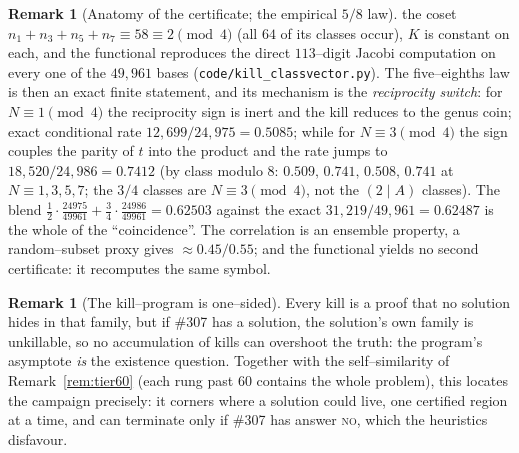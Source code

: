 \documentclass[11pt]{article}
\theoremstyle{definition}
\newtheorem{remark}[theorem]{Remark}
\begin{document}
\begin{remark}[Anatomy of the certificate; the empirical $5/8$ law]
the coset $n_1+n_3+n_5+n_7\equiv58\equiv2\pmod4$ (all $64$ of its classes occur), $K$ is constant
on each, and the functional reproduces the direct $113$--digit Jacobi computation on every one of
the $49{,}961$ bases (\texttt{code/kill\_classvector.py}). The five--eighths law is then an exact
finite statement, and its mechanism is the \emph{reciprocity switch}: for $N\equiv1\pmod4$ the
reciprocity sign is inert and the kill reduces to the genus coin; exact conditional rate
$12{,}699/24{,}975=0.5085$; while for $N\equiv3\pmod4$ the sign couples the parity of $t$ into
the product and the rate jumps to $18{,}520/24{,}986=0.7412$ (by class modulo $8$:
$0.509,\,0.741,\,0.508,\,0.741$ at $N\equiv1,3,5,7$; the $3/4$ classes are $N\equiv3\pmod4$, not
the $(2\mid A)$ classes). The blend $\tfrac12\cdot\tfrac{24975}{49961}+\tfrac34\cdot\tfrac{24986}{49961}
=0.62503$ against the exact $31{,}219/49{,}961=0.62487$ is the whole of the ``coincidence''. The
correlation is an ensemble property, a random--subset proxy gives ${\approx}0.45/0.55$; and
the functional yields no second certificate: it recomputes the same symbol.
\end{remark}

\begin{remark}[The kill--program is one--sided]\label{rem:oneside}
Every kill is a proof that no solution hides in that family, but if \#307 has a solution, the
solution's own family is unkillable, so no accumulation of kills can overshoot the truth: the
program's asymptote \emph{is} the existence question. Together with the self--similarity of
Remark~\ref{rem:tier60} (each rung past $60$ contains the whole problem), this locates the
campaign precisely: it corners where a solution could live, one certified region at a time, and
can terminate only if \#307 has answer \textsc{no}, which the heuristics disfavour.
\end{remark}
\end{document}
